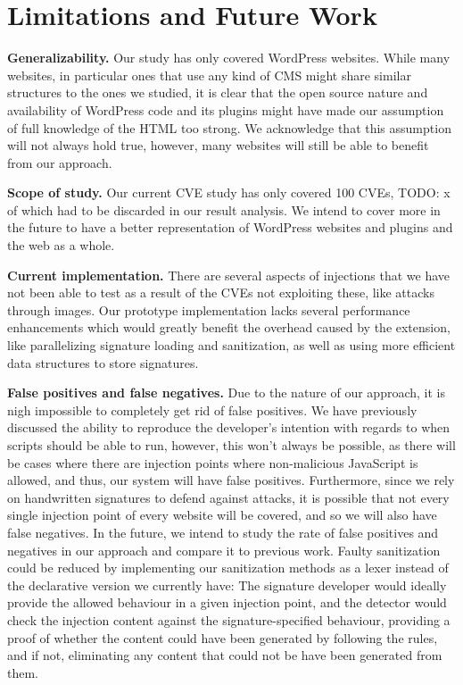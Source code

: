 \section{Limitations and Future Work}
\textbf{Generalizability.} Our study has only covered WordPress websites. While many websites, in particular ones that use any kind of CMS might share similar structures to the ones we studied, it is clear that the open source nature and availability of WordPress code and its plugins might have made our assumption of full knowledge of the HTML too strong. We acknowledge that this assumption will not always hold true, however, many websites will still be able to benefit from our approach.

\textbf{Scope of study.} Our current CVE study has only covered 100 CVEs, TODO: x of which had to be discarded in our result analysis. We intend to cover more in the future to have a better representation of WordPress websites and plugins and the web as a whole. 

\textbf{Current implementation.} There are several aspects of injections that we have not been able to test as a result of the CVEs not exploiting these, like attacks through images. Our prototype implementation lacks several performance enhancements which would greatly benefit the overhead caused by the extension, like parallelizing signature loading and sanitization, as well as using more efficient data structures to store signatures. 

\textbf{False positives and false negatives.} Due to the nature of our approach, it is nigh impossible to completely get rid of false positives. We have previously discussed the ability to reproduce the developer's intention with regards to when scripts should be able to run, however, this won't always be possible, as there will be cases where there are injection points where non-malicious JavaScript is allowed, and thus, our system will have false positives. Furthermore, since we rely on handwritten signatures to defend against attacks, it is possible that not every single injection point of every website will be covered, and so we will also have false negatives. In the future, we intend to study the rate of false positives and negatives in our approach and compare it to previous work. Faulty sanitization could be reduced by implementing our sanitization methods as a lexer instead of the declarative version we currently have: The signature developer would ideally provide the allowed behaviour in a given injection point, and the detector would check the injection content against the signature-specified behaviour, providing a proof of whether the content could have been generated by following the rules, and if not, eliminating any content that could not be have been generated from them.

